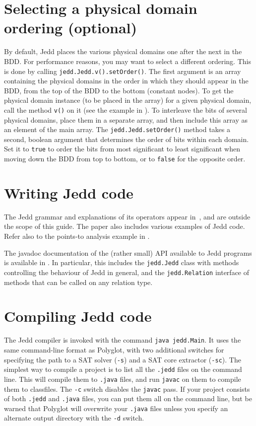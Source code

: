 \documentclass{article}
\begin{document}
\section{Selecting a physical domain ordering (optional)}
By default, Jedd places the various physical domains one after the next
in the BDD. For performance reasons, you may want to select a different
ordering. This is done by calling {\tt jedd.Jedd.v().setOrder()}.
The first argument is an array containing the physical domains in the order
in which they should appear in the BDD, from the top of the BDD to the bottom
(constant nodes). To get the physical domain instance (to be placed in the array)
for a given physical domain, call the method {\tt v()} on it (see the example
in ). To interleave the bits of
several physical domains, place them in a separate array, and then
include this array as an element of the main array. The {\tt jedd.Jedd.setOrder()}
method takes a second, boolean argument that determines the order of bits within
each domain. Set it to {\tt true} to order the bits from most significant to least
significant when moving down the BDD from top to bottom, or to {\tt false} for the
opposite order.

\section{Writing Jedd code}
The Jedd grammar and explanations of its operators appear in~\cite{Lhotak:2004:JBR},
and are outside the scope of this guide. The paper also includes various
examples of Jedd code. Refer also to the points-to analysis example in
.

The javadoc documentation of the (rather small) API available to Jedd programs
is available in . In particular, this includes the
{\tt jedd.Jedd} class with methods controlling the behaviour of Jedd in general,
and the {\tt jedd.Relation} interface of methods that can be called on any
relation type.

\section{Compiling Jedd code}
The Jedd compiler is invoked with the command {\tt java jedd.Main}.
It uses the same command-line format as Polyglot, with two additional
switches for specifying the path to a SAT solver ({\tt -s}) and a
SAT core extractor ({\tt -sc}). The simplest way to compile a project
is to list all the {\tt .jedd} files on the command line. This will
compile them to {\tt .java} files, and run {\tt javac} on them to
compile them to classfiles. The {\tt -c} switch disables the {\tt javac}
pass. If your project consists of both {\tt .jedd} and {\tt .java}
files, you can put them all on the command line, but be warned that
Polyglot will overwrite your {\tt .java} files unless you specify
an alternate output directory with the {\tt -d} switch.
\end{document}

